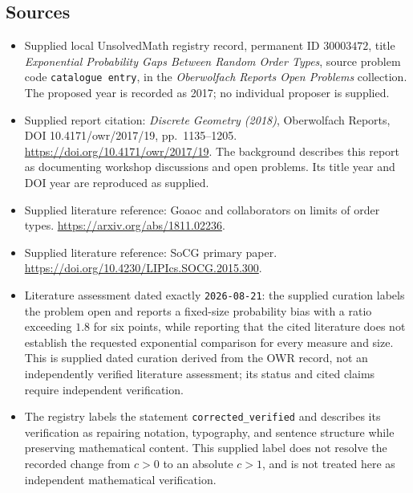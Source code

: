 \documentclass[11pt]{article}
\begin{document}
\subsection{Sources}
\begin{itemize}
\item Supplied local UnsolvedMath registry record, permanent ID \(30003472\), title \emph{Exponential Probability Gaps Between Random Order Types}, source problem code \texttt{catalogue entry}, in the \emph{Oberwolfach Reports Open Problems} collection. The proposed year is recorded as 2017; no individual proposer is supplied.
\item Supplied report citation: \emph{Discrete Geometry (2018)}, Oberwolfach Reports, DOI 10.4171/owr/2017/19, pp.\ 1135--1205. \url{https://doi.org/10.4171/owr/2017/19}. The background describes this report as documenting workshop discussions and open problems. Its title year and DOI year are reproduced as supplied.
\item Supplied literature reference: Goaoc and collaborators on limits of order types. \url{https://arxiv.org/abs/1811.02236}.
\item Supplied literature reference: SoCG primary paper. \url{https://doi.org/10.4230/LIPIcs.SOCG.2015.300}.
\item Literature assessment dated exactly \texttt{2026-08-21}: the supplied curation labels the problem open and reports a fixed-size probability bias with a ratio exceeding \(1.8\) for six points, while reporting that the cited literature does not establish the requested exponential comparison for every measure and size. This is supplied dated curation derived from the OWR record, not an independently verified literature assessment; its status and cited claims require independent verification.
\item The registry labels the statement \texttt{corrected\_verified} and describes its verification as repairing notation, typography, and sentence structure while preserving mathematical content. This supplied label does not resolve the recorded change from \(c>0\) to an absolute \(c>1\), and is not treated here as independent mathematical verification.
\end{itemize}
\end{document}
